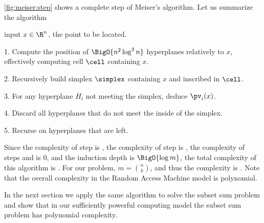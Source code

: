 \ref{fig:meiser:step} shows a complete step of Meiser's algorithm.
Let us summarize the algorithm
\begin{algorithm}
\item[input] $x \in \R^n$, the point to be located.
\item[1.] Compute the position of $\BigO{n^2 \log^2 n}$ hyperplanes relatively to
$x$, effectively computing cell $\cell$ containing $x$.
\item[2.] Recursively build simplex $\simplex$ containing $x$ and inscribed in
$\cell$.
\item[3.] For any hyperplane $H_i$ not meeting the simplex, deduce $\pv_i(x)$.
\item[4.] Discard all hyperplanes that do not meet the inside of the
simplex.
\item[5.] Recurse on hyperplanes that are left.
\end{algorithm}

Since the complexity of step  is , the complexity of step
 is , the complexity of steps  and 
is \(0\),
and the induction depth is $\BigO{\log m}$, the total complexity of this algorithm
is . For our \kSUM problem, $m = \binom{n}{k}$,
and thus the complexity is . Note that the overall
complexity in the Random Access Machine model is polynomial.

In the next section we apply the same algorithm to solve the
subset sum problem and show that in our sufficiently powerful computing
model the subset sum problem has polynomial complexity.

